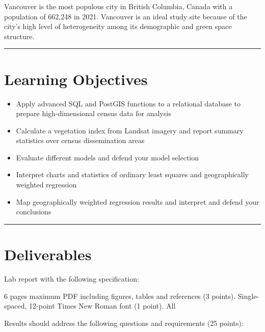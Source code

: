 \documentclass[
]{book}
\begin{document}
Vancouver is the most populous city in British Columbia, Canada with a population of 662,248 in 2021. Vancouver is an ideal study site because of the city's high level of heterogeneity among its demographic and green space structure.

\begin{center}\rule{0.5\linewidth}{0.5pt}\end{center}

\hypertarget{learning-objectives-5}{%
\section*{Learning Objectives}\label{learning-objectives-5}}

\begin{itemize}
\item
  Apply advanced SQL and PostGIS functions to a relational database to prepare high-dimensional census data for analysis
\item
  Calculate a vegetation index from Landsat imagery and report summary statistics over census dissemination areas
\item
  Evaluate different models and defend your model selection
\item
  Interpret charts and statistics of ordinary least squares and geographically weighted regression
\item
  Map geographically weighted regression results and interpret and defend your conclusions
\end{itemize}

\begin{center}\rule{0.5\linewidth}{0.5pt}\end{center}

\hypertarget{lab6-deliverables}{%
\section*{Deliverables}\label{lab6-deliverables}}

Lab report with the following specification:

6 pages maximum PDF including figures, tables and references (3 points). Single-spaced, 12-point Times New Roman font (1 point). All

Results should address the following questions and requirements (25 points):
\end{document}
